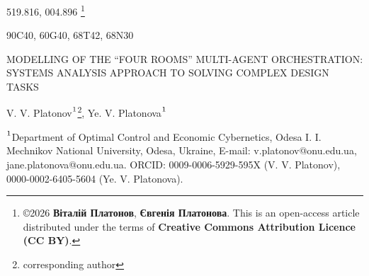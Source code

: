 \documentclass[12pt, reqno, a4paper]{amsart}
\theoremstyle{definition}
\theoremstyle{plain}
\theoremstyle{plain}
\theoremstyle{plain}
\theoremstyle{remark}
\theoremstyle{plain}
\begin{document}
\newcommand\blfootnote[1]{
    \begingroup
    \renewcommand\thefootnote{}\footnote{#1}
    \addtocounter{footnote}{-1}
    \endgroup
}


\pagestyle{fancyplain} \thispagestyle{plain}

\newcommand {\R} {\mathbb{R}}
\newcommand{\FrDer}[2][0]{\ensuremath{\mathcal{D}_{#1}^{#2}}}
\newcommand{\COmega}{C\left(\overline\Omega\right)}


 {\small
  \NoPageNumbers

\begin{Udc}
 519.816, 004.896 \blfootnote{\copyright 2026 \textbf{Віталій Платонов}, \textbf{Євгенія Платонова}. This is an open-access article distributed under the terms of \textbf{Creative Commons Attribution Licence (CC BY)}.}
\end{Udc}
\begin{MSC}
 90C40, 60G40, 68T42, 68N30
\end{MSC}

\begin{Title}
MODELLING OF THE ``FOUR ROOMS'' MULTI-AGENT ORCHESTRATION: SYSTEMS ANALYSIS APPROACH TO SOLVING COMPLEX DESIGN TASKS
\end{Title}
  \begin{Authors}
      {V. V. Platonov${\mathstrut}^1$\footnote[1]{corresponding author}, Ye. V. Platonova${\mathstrut}^1$}
  \end{Authors}

{\scriptsize \noindent ${\mathstrut}^1$Department of Optimal Control and Economic Cybernetics, Odesa I. I. Mechnikov National University, Odesa, Ukraine, E-mail: v.platonov@onu.edu.ua, jane.platonova@onu.edu.ua. ORCID: 0009-0006-5929-595X (V. V. Platonov), 0000-0002-6405-5604 (Ye. V. Platonova).
\par}


}
\end{document}
